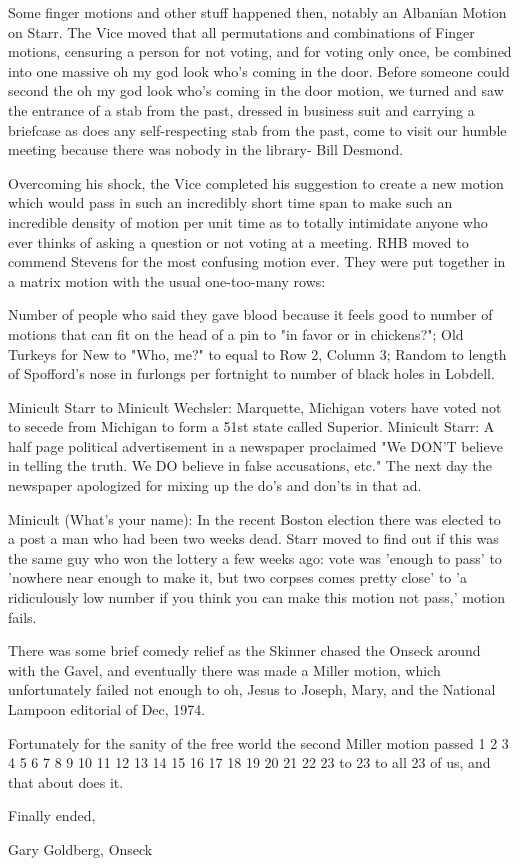 \documentclass[12pt]{article}
\begin{document}
Some finger motions and other stuff happened then, notably an Albanian Motion on Starr. The Vice moved that all permutations and combinations of Finger motions, censuring a person for not voting, and for voting only once, be combined into one massive oh my god look who's coming in the door. Before someone could second the oh my god look who's coming in the door motion, we turned and saw the entrance of a stab from the past, dressed in business suit and carrying a briefcase as does any self-respecting stab from the past, come to visit our humble meeting because there was nobody in the library- Bill Desmond.

Overcoming his shock, the Vice completed his suggestion to create a new motion which would pass in such an incredibly short time span to make such an incredible density of motion per unit time as to totally intimidate anyone who ever thinks of asking a question or not voting at a meeting. RHB moved to commend Stevens for the most confusing motion ever. They were put together in a matrix motion with the usual one-too-many rows:

Number of people who said they gave blood because it feels good to number of motions that can fit on the head of a pin to "in favor or in chickens?"; Old Turkeys for New to "Who, me?" to equal to Row 2, Column 3; Random to length of Spofford's nose in furlongs per fortnight to number of black holes in Lobdell.

Minicult Starr to Minicult Wechsler: Marquette, Michigan voters have voted not to secede from Michigan to form a 51st state called Superior. Minicult Starr: A half page political advertisement in a newspaper proclaimed "We DON'T believe in telling the truth. We DO believe in false accusations, etc." The next day the newspaper apologized for mixing up the do's and don'ts in that ad.

Minicult (What's your name): In the recent Boston election there was elected to a post a man who had been two weeks dead. Starr moved to find out if this was the same guy who won the lottery a few weeks ago: vote was 'enough to pass' to 'nowhere near enough to make it, but two corpses comes pretty close' to 'a ridiculously low number if you think you can make this motion not pass,' motion fails.

There was some brief comedy relief as the Skinner chased the Onseck around with the Gavel, and eventually there was made a Miller motion, which unfortunately failed not enough to oh, Jesus to Joseph, Mary, and the National Lampoon editorial of Dec, 1974.

Fortunately for the sanity of the free world the second Miller motion passed 1 2 3 4 5 6 7 8 9 10 11 12 13 14 15 16 17 18 19 20 21 22 23 to 23 to all 23 of us, and that about does it.

\vspace{12pt}

\centerline{Finally ended,}
\centerline{Gary Goldberg, Onseck}
\end{document}
